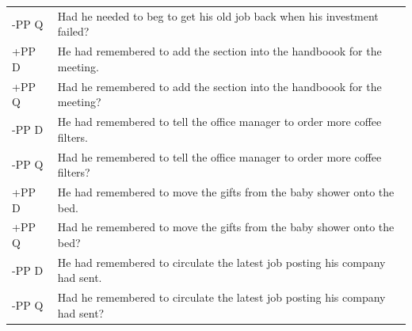 \documentclass[12pt,oneside]{book}
\begin{document}
\begin{longtable}{ll}
-PP Q & Had he needed to beg to get his old job back when his investment failed?\\
\addlinespace
+PP D & He had remembered to add the section into the handboook for the meeting.\\
+PP Q & Had he remembered to add the section into the handboook for the meeting?\\
\addlinespace
-PP D & He had remembered to tell the office manager to order more coffee filters.\\
-PP Q & Had he remembered to tell the office manager to order more coffee filters?\\
\addlinespace
+PP D & He had remembered to move the gifts from the baby shower onto the bed.\\
+PP Q & Had he remembered to move the gifts from the baby shower onto the bed?\\
\addlinespace
-PP D & He had remembered to circulate the latest job posting his company had sent.\\
-PP Q & Had he remembered to circulate the latest job posting his company had sent?\\*
\end{longtable}

\newpage
\end{document}

